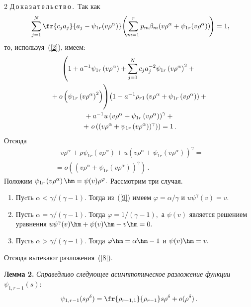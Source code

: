 \begin{multicols}{2}
\noindent
Д\,о\,к\,а\,з\,а\,т\,е\,л\,ь\,с\,т\,в\,о\,.\
Так как
$$
\sum\limits_{j=1}^N\fr{c_ja_j}{a_j-\psi_{1r}(v\rho^{\alpha})}
\!\left(\sum\limits_{m=1}^rp_m\beta_m(v\rho^{\alpha}+\psi_{1r}(v\rho^{\alpha}))\!\right)=1,\hspace*{-2.73624pt}
$$
то, используя~(\ref{2}), имеем:
\begin{multline*}
\left(1+a^{-1}\psi_{1r}\left(v\rho^{\alpha}\right)+
\sum\limits_{j=1}^Nc_ja_j^{-2}\psi_{1r}\left(v\rho^{\alpha}\right)^2
+{}\right.\\
\left.{}+o\left(\psi_{1r}\left(v\rho^{\alpha}\right)^2\right)
\vphantom{\sum\limits_{j=1}^N}
\!\right)\!
\left(1-a^{-1}\rho_{r1}\left(v\rho^{\alpha}+\psi_{1r}\left(v\rho^{\alpha}\right)\right)+{}\right.\\
\left.{}+
a^{-1}u\left(v\rho^{\alpha}+\psi_{1r}\left(v\rho^{\alpha}\right)\right)^{\gamma}+{}\right.\\
{}+\left.
o\left(\left(v\rho^{\alpha}+\psi_{1r}\left(v\rho^{\alpha}\right)\right)^{\gamma}\right)\right)
=1\,.
\end{multline*}
Отсюда
\begin{multline}
-v\rho^{\alpha}+\rho\psi_{1r}\left(v\rho^{\alpha}\right)+u\left(v\rho^{\alpha}+\psi_{1r}\left(v\rho^{\alpha}\right)\right)^{\gamma}
={}\\
{}=o\left(\left(v\rho^{\alpha}+\psi_{1r}\left(v\rho^{\alpha}\right)\right)^{\gamma}\right)\,.
\label{9}
\end{multline}
Положим $\psi_{1r}\left(v\rho^{\alpha}\right)\hm=\psi(v)\rho^{\varphi}.$ Рассмотрим три случая.
\begin{enumerate}[1.]
\item Пуcть $\alpha<{\gamma}/({\gamma-1}).$ Тогда из~(\ref{9}) имеем 
$\varphi={\alpha}/{\gamma}$ и $u\psi^{\gamma}(v)=v.$
\item Пусть $\alpha={\gamma}/({\gamma-1}).$ Тогда  $\varphi={1}/({\gamma-1}),$ 
а $\psi(v)$ является решением уравнения $u\psi^{\gamma}(v)\hm+\psi(v)\hm-v\hm=0.$
\item Пусть $\alpha>{\gamma}/({\gamma-1}).$ Тогда $\varphi\hm=\alpha\hm-1$ и $\psi(v)\hm=v.$
\end{enumerate}

Отсюда вытекают разложения~(\ref{8}).

\medskip

\noindent
\textbf{Лемма 2.} \textit{Справедливо следующее асимптотическое разложение 
функции} $\psi_{1,r-1}(s)$:
\begin{equation*}
\psi_{1,r-1}(s\rho^{\delta})=\fr{\rho_{r-1,1}}{\rho_{r-1}}s\rho^{\delta}+o(\rho^{\delta})\,.
\end{equation*}


\end{multicols}
